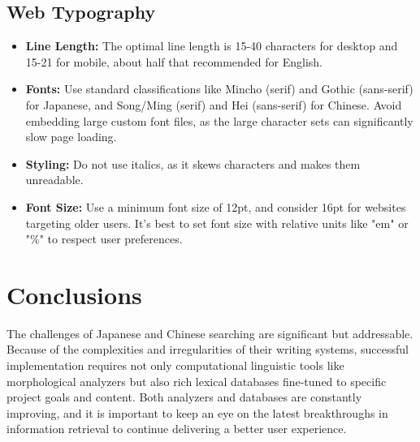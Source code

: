 \documentclass[11pt]{article}
\begin{document}
\subsection{Web Typography}
\begin{itemize}
    \item \textbf{Line Length:} The optimal line length is 15-40 characters for desktop and 15-21 for mobile, about half that recommended for English.
    \item \textbf{Fonts:} Use standard classifications like Mincho (serif) and Gothic (sans-serif) for Japanese, and Song/Ming (serif) and Hei (sans-serif) for Chinese. Avoid embedding large custom font files, as the large character sets can significantly slow page loading.
    \item \textbf{Styling:} Do not use italics, as it skews characters and makes them unreadable.
    \item \textbf{Font Size:} Use a minimum font size of 12pt, and consider 16pt for websites targeting older users. It's best to set font size with relative units like "em" or "\%" to respect user preferences.
\end{itemize}

\section{Conclusions}
The challenges of Japanese and Chinese searching are significant but addressable. Because of the complexities and irregularities of their writing systems, successful implementation requires not only computational linguistic tools like morphological analyzers but also rich lexical databases fine-tuned to specific project goals and content. Both analyzers and databases are constantly improving, and it is important to keep an eye on the latest breakthroughs in information retrieval to continue delivering a better user experience.
\end{document}
